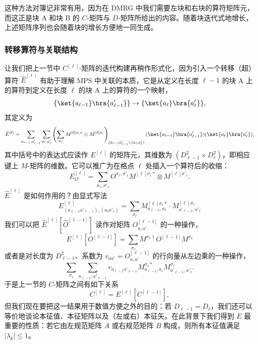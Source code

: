 这种方法对簿记非常有用，因为在 DMRG 中我们需要左块和右块的算符矩阵元，而这正是块 A 和块 B 的 $C$-矩阵与 $D$-矩阵所给出的内容。随着块迭代式地增长，上述矩阵序列也会随着块的增长方便地一同生成。

\subsubsection{转移算符与关联结构}
\label{subsubsec:transferoperator}
让我们把上一节中 $C^{[\ell]}$-矩阵的迭代构建再稍作形式化，因为引入一个转移（超）算符 $\hat{E}^{[\ell]}$ 有助于理解 MPS 中关联的本质，它是从定义在长度 $\ell-1$ 的块 A 上的算符到定义在长度 $\ell$ 的块 A 上的算符的一个映射，
\begin{equation}
\{ \ket{a_{\ell-1}} \bra{a'_{\ell-1}} \} \rightarrow \{ \ket{a_{\ell}} \bra{a'_{\ell}} \},
\end{equation}
其定义为
\begin{equation}
\hat{E}^{[\ell]} = \sum_{a_{\ell-1},a'_{\ell-1}} \sum_{a_\ell,a'_\ell} \left( \sum_{\sigma_\ell} M^{[\ell]\sigma_\ell *} \otimes M^{[\ell]\sigma_\ell} \right)_{(a_{\ell-1}a'_{\ell-1}),(a_\ell,a'_\ell)} (\ket{a_{\ell-1}} \bra{a'_{\ell-1}}) (\ket{a_{\ell}} \bra{a'_{\ell}}),
\end{equation}
其中括号中的表达式应读作 $E^{[\ell]}$ 的矩阵元，其维数为 $(D^2_{\ell-1} \times D^2_{\ell})$，即相应键上 $M$-矩阵的维数。它可以推广为在格点 $\ell$ 处插入一个算符后的收缩：
\begin{equation}
E^{[\ell]}_O = \sum_{\sigma_\ell,\sigma'_\ell} O^{\sigma_\ell,\sigma'_\ell} M^{[\ell]\sigma_\ell *} \otimes M^{[\ell]\sigma'_\ell} .
\end{equation}
$\hat{E}^{[\ell]} $ 是如何作用的？由显式写法
\begin{equation}
E^{[\ell]}_{(a_{\ell-1}a'_{\ell-1}),(a_{\ell}a'_{\ell})} = \sum_{\sigma_\ell} M^{[\ell]\sigma_\ell *}_{a_{\ell-1},a_\ell} \cdot M^{[\ell]\sigma_\ell}_{a'_{\ell-1},a'_\ell}
\end{equation}
我们可以把 $\hat{E}^{[\ell]}[ \hat{O}^{[\ell-1]}]$ 读作对矩阵 $O^{[\ell-1]}_{a,a'}$ 的一种操作，
\begin{equation}
E^{[\ell]} [O^{[\ell-1]}]  = \sum_{\sigma_\ell} M^{\sigma_\ell\dagger} O^{[\ell-1]} M^{\sigma_\ell}
\end{equation}
或者是对长度为 $D_{\ell-1}^2$、系数为 $v_{aa'} = O^{[\ell-1]}_{a,a'}$ 的行向量从左边乘的一种操作，
\begin{equation}
\sum_{\sigma_\ell} \sum_{a_{\ell-1},a'_{\ell-1}} v_{a_{\ell-1}a'_{\ell-1}} M^{\sigma_\ell*}_{a_{\ell-1},a_\ell} M^{\sigma_\ell}_{a'_{\ell-1},a'_\ell} .
\end{equation}
于是上一节的 $C$-矩阵之间有如下关系
\begin{equation}
C^{[\ell]} = E^{[\ell]} [C^{[\ell-1]}]  ,
\end{equation}
但我们现在要把这一结果用于数值方便之外的目的：若 $D_{\ell-1}=D_\ell$，我们还可以等价地谈论本征值、本征矩阵以及（左或右）本征矢。在此背景下我们得到 $E$ 最重要的性质：若它由左规范矩阵 $A$ 或右规范矩阵 $B$ 构成，则所有本征值满足 $|\lambda_k| \leq 1$。

